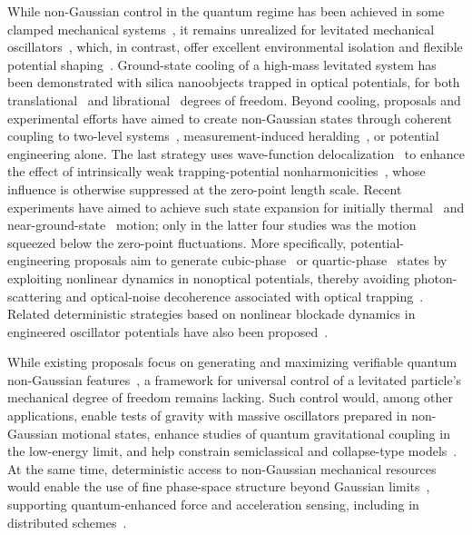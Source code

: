 \documentclass[reprint,prx,footinbib,floatfix,twocolumn,longbibliography,superscriptaddress]{revtex4-2}
\begin{document}
While non-Gaussian control in the quantum regime has been achieved in some clamped mechanical systems~\cite{Bild2023,Marti2024,Galinskiy2024,Yang2024}, it remains unrealized for levitated mechanical oscillators~\cite{Gonzalez-Ballestero2021,Millen2020}, which, in contrast, offer excellent environmental isolation and flexible potential shaping~\cite{Rashid2016,Hebestreit2018,Frimmer2019,Ciampini2025,Bonvin2024}.
Ground-state cooling of a high-mass levitated system has been demonstrated with silica nanoobjects trapped in optical potentials, for both translational~\cite{Delic2020,Magrini2021,Tebbenjohanns2021,Kamba2022,Ranfagni2022,Piotrowski2023,Kamba2023a,Deplano2025} and librational~\cite{Dania2025,Troyer2026} degrees of freedom.
Beyond cooling, proposals and experimental efforts have aimed to create non-Gaussian states through coherent coupling to two-level systems~\cite{Romero-Isart2012,Hoang2016,Martinetz2020,Perdriat2021,Marshman2022,Bykov2025,Gupta2025}, measurement-induced heralding~\cite{Bemani2025}, or potential engineering alone.
The last strategy uses wave-function delocalization~\cite{Romero-Isart2017,Weiss2021,Braccini2024,Zhou2025,Ji2026} to enhance the effect of intrinsically weak trapping-potential nonharmonicities~\cite{Riera-Campeny2024,Roda-Llordes2024b,Rosiek2024}, whose influence is otherwise suppressed at the zero-point length scale.
Recent experiments have aimed to achieve such state expansion for initially thermal~\cite{Rashid2016,Hebestreit2018,Kamba2023,Bonvin2024,Muffato2025,Duchan2025,Steiner2025,Tomassi2026,Seta2026} and near-ground-state~\cite{Rossi2025,Kamba2025,Otabe2026,Skrabulis2026} motion; only in the latter four studies was the motion squeezed below the zero-point fluctuations.
More specifically, potential-engineering proposals aim to generate cubic-phase~\cite{Gottesman2001,Rakhubovsky2021,Neumeier2024,Roda-Llordes2024,Casulleras2024} or quartic-phase~\cite{Rosiek2024} states by exploiting nonlinear dynamics in nonoptical potentials, thereby avoiding photon-scattering and optical-noise decoherence associated with optical trapping~\cite{Jain2016,Pino2018,Maurer2023}.
Related deterministic strategies based on nonlinear blockade dynamics in engineered oscillator potentials have also been proposed~\cite{Huang2021}.

While existing proposals focus on generating and maximizing verifiable quantum non-Gaussian features~\cite{Neumeier2024,Roda-Llordes2024b,Riera-Campeny2026}, a framework for universal control of a levitated particle’s mechanical degree of freedom remains lacking.
Such control would, among other applications, enable tests of gravity with massive oscillators prepared in non-Gaussian motional states, enhance studies of quantum gravitational coupling in the low-energy limit, and help constrain semiclassical and collapse-type models~\cite{Romero-Isart2011,Bose2025}.
At the same time, deterministic access to non-Gaussian mechanical resources would enable the use of fine phase-space structure beyond Gaussian limits~\cite{Fadel2025,Grochowski2025,Park2025}, supporting quantum-enhanced force and acceleration sensing, including in distributed schemes~\cite{Grochowski2026}.
\end{document}
